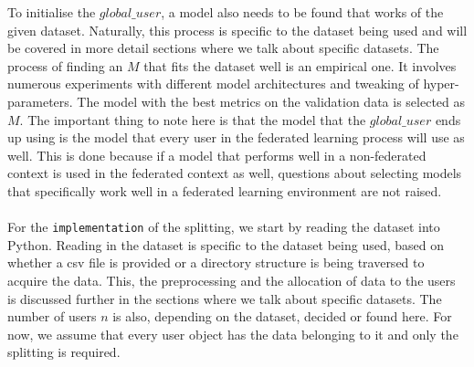 \documentclass[12pt]{article}
\begin{document}
\noindent To initialise the $global\_user$, a model also needs to be found that works of the given dataset. Naturally, this process is specific to the dataset being used and will be covered in more detail sections where we talk about specific datasets. The process of finding an $M$ that fits the dataset well is an empirical one. It involves numerous experiments with different model architectures and tweaking of hyper-parameters. The model with the best metrics on the validation data is selected as $M$. The important thing to note here is that the model that the $global\_user$ ends up using is the model that every user in the federated learning process will use as well. This is done because if a model that performs well in a non-federated context is used in the federated context as well, questions about selecting models that specifically work well in a federated learning environment are not raised. 
\\\\
For the \texttt{implementation} of the splitting, we start by reading the dataset into Python. Reading in the dataset is specific to the dataset being used, based on whether a csv file is provided or a directory structure is being traversed to acquire the data. This, the preprocessing and the allocation of data to the users is discussed further in the sections where we talk about specific datasets. The number of users $n$ is also, depending on the dataset, decided or found here. For now, we assume that every user object has the data belonging to it and only the splitting is required.
\\\\
\end{document}
